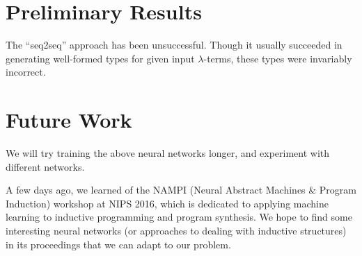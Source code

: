 \documentclass{amsart}
\begin{document}
\section{Preliminary Results}

The ``seq2seq'' approach has been unsuccessful. Though it usually
succeeded in generating well-formed types for given input
$\lambda$-terms, these types were invariably incorrect.

\section{Future Work}

We will try training the above neural networks longer, and experiment
with different networks.

A few days ago, we learned of the NAMPI (Neural Abstract Machines \&
Program Induction) workshop at NIPS 2016, which is dedicated to
applying machine learning to inductive programming and program
synthesis. We hope to find some interesting neural networks (or
approaches to dealing with inductive structures) in its proceedings
that we can adapt to our problem.



\end{document}

